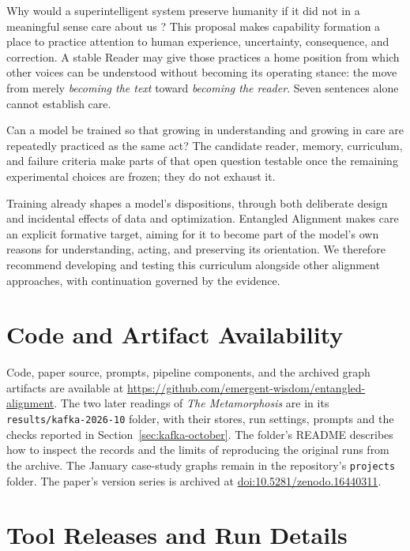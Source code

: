 \documentclass[11pt]{article}
\begin{document}
Why would a superintelligent system preserve humanity if it did not in a
meaningful sense care about us \cite{westerberg2025superintelligence}?
This proposal makes capability
formation a place to practice attention to human experience, uncertainty,
consequence, and correction. A stable Reader may give those practices a home
position from which other voices can be understood without becoming its
operating stance: the move from merely \emph{becoming the text} toward
\emph{becoming the reader}. Seven sentences alone cannot establish care.

Can a model
be trained so that growing in understanding and growing in care are repeatedly
practiced as the same act? The candidate reader, memory, curriculum, and
failure criteria make parts of that open question testable once the remaining
experimental choices are frozen; they do not exhaust it.

Training already shapes a model's dispositions, through both deliberate design
and incidental effects of data and optimization. Entangled Alignment makes care an explicit
formative target, aiming for it to become part of the model's own reasons for
understanding, acting, and preserving its orientation. We therefore recommend
developing and testing this curriculum alongside other alignment approaches,
with continuation governed by the evidence.

	\section*{Code and Artifact Availability}

	Code, paper source, prompts, pipeline components, and the archived graph artifacts are available at \url{https://github.com/emergent-wisdom/entangled-alignment}. The two later readings of \emph{The Metamorphosis} are in its \texttt{results/kafka-2026-10} folder, with their stores, run settings, prompts and the checks reported in Section~\ref{sec:kafka-october}. The folder's README describes how to inspect the records and the limits of reproducing the original runs from the archive. The January case-study graphs remain in the repository's \texttt{projects} folder. The paper's version series is archived at \href{https://doi.org/10.5281/zenodo.16440311}{doi:10.5281/zenodo.16440311}.

	\begingroup
	\footnotesize
	
	
	\endgroup

\clearpage
\appendix

\section{Tool Releases and Run Details}\label{app:runs}
\end{document}
